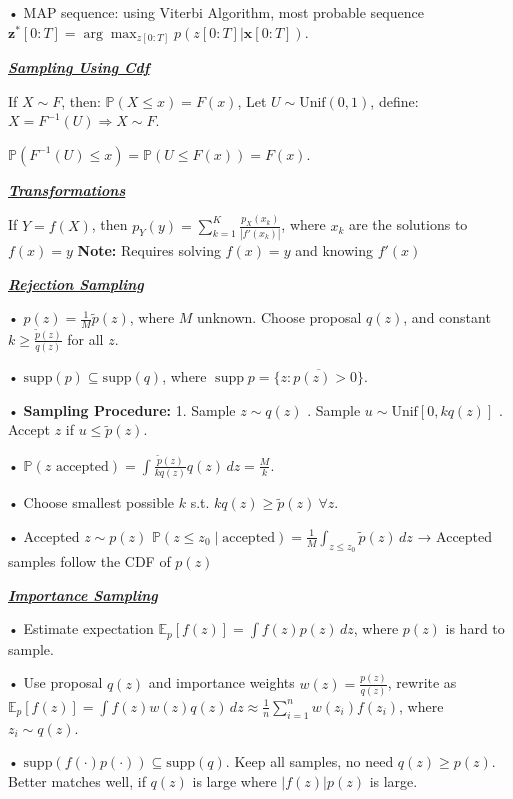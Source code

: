 \documentclass[10pt]{article}
\newcommand{\bulletPoint}[1]{\ul{\textit{\textbf{#1}}}}
\begin{document}
\begin{multicols*}{3}
• MAP sequence: using Viterbi Algorithm, most probable sequence $\mathbf{z}^*[0:T] = \arg\max_{z[0:T]} p(z[0:T] | \mathbf{x}[0:T])$.


\bulletPoint{Sampling Using Cdf}\quad

If \( X \sim F \), then:
$\mathbb{P}(X \leq x) = F(x)$, \quad
Let \( U \sim \text{Unif}(0,1) \), define:
$X = F^{-1}(U)
\Rightarrow X \sim F$. 

$\mathbb{P}(F^{-1}(U) \leq x) = \mathbb{P}(U \leq F(x)) = F(x)$. 

\bulletPoint{Transformations}\quad

If \( Y = f(X) \), then \( p_Y(y) = \sum_{k=1}^K \frac{p_X(x_k)}{|f'(x_k)|} \), where \( x_k \) are the solutions to \( f(x) = y \)
\quad\textbf{Note:} Requires solving \( f(x) = y \) and knowing \( f'(x) \)


\bulletPoint{Rejection Sampling}\quad

• \( p(z) = \frac{1}{M} \tilde{p}(z) \), where \( M \) unknown. 
Choose proposal \( q(z) \), and constant \( k \geq \frac{\tilde{p}(z)}{q(z)} \) for all \( z \). 

• \( \text{supp}(p) \subseteq \text{supp}(q) \), where $\operatorname{supp} p = \overline{ \{ z : p(z) > 0 \} }$. 

• \textbf{Sampling Procedure:}
1. Sample \( z \sim q(z) \) . Sample \( u \sim \text{Unif}[0, kq(z)] \) . Accept \( z \) if \( u \leq \tilde{p}(z) \). 

• $\mathbb{P}(z\text{ accepted}) = \int \frac{\tilde{p}(z)}{kq(z)} q(z)\,dz = \frac{M}{k}$. \quad

• Choose smallest possible \( k \) s.t. \( kq(z) \geq \tilde{p}(z) \ \forall z \). \quad

• Accepted \( z \sim p(z) \)
$\mathbb{P}(z \leq z_0 \mid \text{accepted}) = \frac{1}{M} \int_{z \leq z_0} \tilde{p}(z)\,dz$
→ Accepted samples follow the CDF of \( p(z) \)

\bulletPoint{Importance Sampling}\quad

• Estimate expectation $\mathbb{E}_p[f(z)] = \int f(z)p(z)\,dz$, where $p(z)$ is hard to sample.  

• Use proposal $q(z)$ and importance weights $w(z) = \frac{p(z)}{q(z)}$, rewrite as  
$\mathbb{E}_p[f(z)] = \int f(z)w(z)q(z)\,dz \approx \frac{1}{n} \sum_{i=1}^n w(z_i)f(z_i)$, where $z_i \sim q(z)$. 

• $\text{supp}(f(\cdot)p(\cdot)) \subseteq \text{supp}(q)$. Keep all samples, no need $q(z) \geq p(z)$. Better matches well, if $q(z)$ is large where $|f(z)|p(z)$ is large. 


\end{multicols*}
\end{document}
